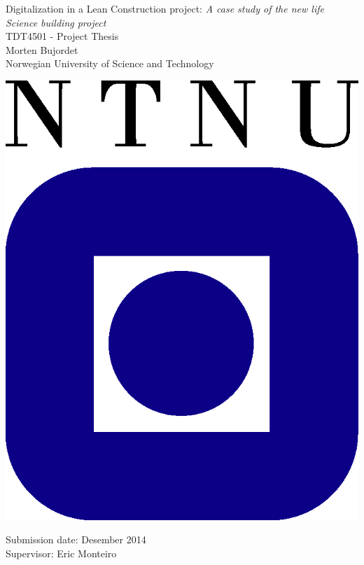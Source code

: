 \clearpage
\begin{titlepage}
    \begin{center}
    
        {\Huge Digitalization in a Lean Construction project: \textit{A case study of the new life Science building project}} \\[0.4cm]
    
        {\Large TDT4501 - Project Thesis} \\[2.0cm]
        {\Large Morten Bujordet} \\ [0.5cm]
        {\Large Norwegian University of Science and Technology}\\
    
        \vspace{3.0cm}
    
                \includegraphics{fig/ntnu-logo2.png}
    
        \vspace{3.0cm}
    
        {\Large Submission date: Desember 2014} \\[0.2cm]
        {\Large Supervisor: Eric Monteiro} \\ [0.2cm]
    \end{center}
\end{titlepage}
\cleardoublepage